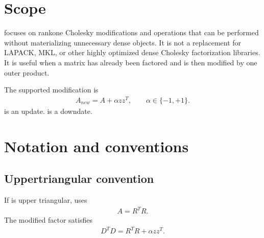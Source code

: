 \documentclass[a4paper,11pt,english]{sphinxmanual}
\begin{document}
\section{Scope}
\label{\detokenize{manual:scope}}
\sphinxAtStartPar
{} focuses on rank\sphinxhyphen{}one Cholesky modifications and operations that can
be performed without materializing unnecessary dense objects.  It is not a
replacement for LAPACK, MKL, or other highly optimized dense Cholesky
factorization libraries.  It is useful when a matrix has already been factored
and is then modified by one outer product.

\sphinxAtStartPar
The supported modification is
\begin{equation*}
\begin{split}A_{new} = A + \alpha z z^T, \qquad \alpha \in \{-1,+1\}.\end{split}
\end{equation*}
\sphinxAtStartPar
{} is an update.   is a downdate.


\section{Notation and conventions}
\label{\detokenize{manual:notation-and-conventions}}

\subsection{Upper\sphinxhyphen{}triangular convention}
\label{\detokenize{manual:upper-triangular-convention}}
\sphinxAtStartPar
If  is upper triangular,  uses
\begin{equation*}
\begin{split}A = R^T R.\end{split}
\end{equation*}
\sphinxAtStartPar
The modified factor  satisfies
\begin{equation*}
\begin{split}D^T D = R^T R + \alpha z z^T.\end{split}
\end{equation*}
\end{document}

